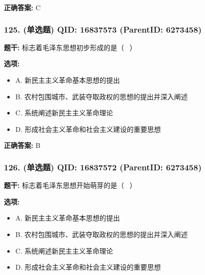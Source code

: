 \documentclass[12pt,UTF8]{ctexart}
\begin{document}
\textbf{正确答案:}
C

\vspace{0.3em}\hrulefill\vspace{0.7em}

\subsubsection*{125. (单选题) \small QID: 16837573 (ParentID: 6273458)}

\textbf{题干:}
标志着毛泽东思想初步形成的是（  ）



\textbf{选项:}
\begin{itemize}[leftmargin=*]

  \item A. 新民主主义革命基本思想的提出

  \item B. 农村包围城市、武装夺取政权的思想的提出并深入阐述

  \item C. 系统阐述新民主主义革命理论

  \item D. 形成社会主义革命和社会主义建设的重要思想

\end{itemize}

\textbf{正确答案:}
B

\vspace{0.3em}\hrulefill\vspace{0.7em}

\subsubsection*{126. (单选题) \small QID: 16837572 (ParentID: 6273458)}

\textbf{题干:}
标志着毛泽东思想开始萌芽的是（  ）



\textbf{选项:}
\begin{itemize}[leftmargin=*]

  \item A. 新民主主义革命基本思想的提出

  \item B. 农村包围城市、武装夺取政权的思想的提出并深入阐述

  \item C. 系统阐述新民主主义革命理论

  \item D. 形成社会主义革命和社会主义建设的重要思想

\end{itemize}
\end{document}
